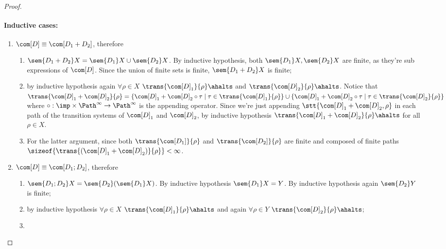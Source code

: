 \begin{proof}
  \paragraph*{Inductive cases:\\}
  \begin{enumerate}
  \item \(\com[D]\equiv \com[D_1 + D_2]\), therefore
    \begin{enumerate}[label=(\roman*).]
    \item \(\sem{D_1 + D_2} X = \sem{D_1}X \cup \sem{D_2}X\). By
      inductive hypothesis, both \(\sem{D_1}X, \sem{D_2}X\) are
      finite, as they're sub expressions of \(\com[D]\). Since the
      union of finite sets is finite, \(\sem{D_1 + D_2}X\) is finite;
    \item by inductive hypothesis again \(\forall \rho \in X\)
      \(\trans{\com[D]_1}{\rho}\ahalts\) and
      \(\trans{\com[D]_2}{\rho}\ahalts\). Notice that
      \(\trans{\com[D]_1 + \com[D]_2}{\rho} = \{\com[D]_1 + \com[D]_2
      \circ \tau \mid \tau \in \trans{\com[D]_1}{\rho} \}\cup \{
      \com[D]_1 + \com[D]_2 \circ \tau \mid \tau \in
      \trans{\com[D]_2}{\rho} \}\) where
      \(\circ : \imp \times \Path^\infty \to \Path^\infty\) is the
      appending operator. Since we're just appending
      \(\stt{\com[D]_1 + \com[D]_2, \rho}\) in each path of the
      transition systems of \(\com[D]_1\) and \(\com[D]_2\), by
      inductive hypothesis
      \(\trans{\com[D]_1 + \com[D]_2}{\rho} \ahalts\) for all
      \(\rho \in X\).
    \item For the latter argument, since both
      \(\trans{\com[D_1]}{\rho}\) and \(\trans{\com[D_2]}{\rho}\) are
      finite and composed of finite paths
      \(\sizeof{\trans{(\com[D]_1 + \com[D]_2)}{\rho}} < \infty\).
    \end{enumerate}
  \item \(\com[D]\equiv \com[D_1; D_2]\), therefore
    \begin{enumerate}[label=(\roman*).]
    \item \(\sem{D_1;D_2}X = \sem{D_2}(\sem{D_1}X)\). By inductive
      hypothesis \(\sem{D_1}X = Y\). By inductive hypothesis again
      \(\sem{D_2}Y\) is finite;
    \item by inductive hypothesis \(\forall \rho \in X\)
      \(\trans{\com[D]_1}{\rho}\ahalts\) and again
      \(\forall \rho \in Y\) \(\trans{\com[D]_2}{\rho}\ahalts\);
    \item 
    \end{enumerate}
  \end{enumerate}
\end{proof}

